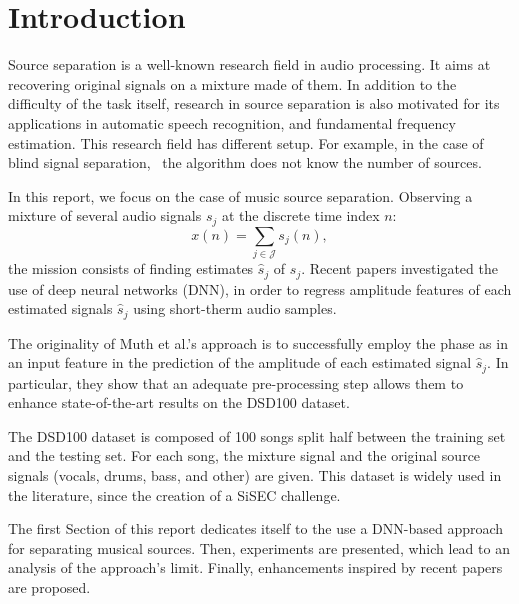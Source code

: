\section{Introduction}

Source separation is a well-known research field in audio processing. It aims at recovering original signals on a mixture made of them.
In addition to the difficulty of the task itself, research in source separation is also motivated for its applications in automatic
speech recognition, and fundamental frequency estimation.
This research field has different setup. For example, in the case of blind signal separation,~\cite{comon2010handbook} the algorithm does not know the number of sources. 

In this report, we focus on the case of music source separation.
Observing a mixture of several audio signals $s_j$ at the discrete time index $n$: 
$$x(n) = \sum_{j\in \mathcal{J}} {s_j(n)},$$ 
the mission consists of finding estimates $\hat{s}_j$ of $s_j$. 
Recent papers investigated the use of deep neural networks (DNN), in order to regress amplitude features of each estimated signals $\hat{s}_j$ using  short-therm audio samples.


The originality of Muth et al.'s approach \cite{muth2018improving} is to successfully employ the phase as in an input feature in the prediction of the amplitude of each estimated signal $\hat{s}_j$.
In particular, they show that an adequate pre-processing step allows them to enhance state-of-the-art results on the DSD100 dataset.

The DSD100 dataset is composed of 100 songs split half between the training set and the testing set. For each song, the mixture signal and the original source signals (vocals, drums, bass, and other) are given.
This dataset is widely used in the literature, since the creation of a SiSEC challenge. 

The first Section of this report dedicates itself to the use a DNN-based approach for separating musical sources. Then, experiments are presented, which lead to an analysis of the approach's limit.  
Finally, enhancements inspired by recent papers are proposed. 




